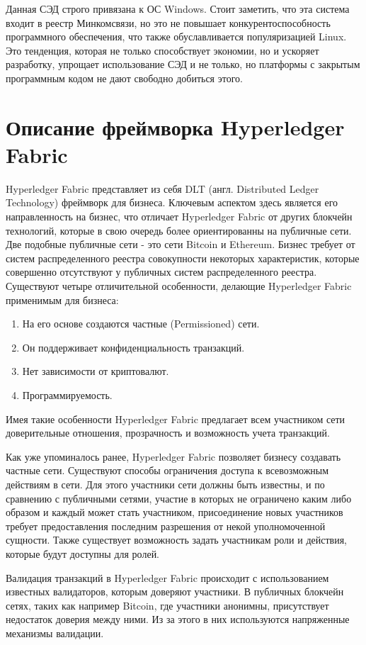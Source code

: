 Данная СЭД строго привязана к ОС Windows. Стоит заметить, что эта система входит в реестр Минкомсвязи, но это не повышает конкурентоспособность программного обеспечения, что также обуславливается популяризацией Linux. Это тенденция, которая не только способствует экономии, но и ускоряет разработку, упрощает использование СЭД и не только, но платформы с закрытым программным кодом не дают свободно добиться этого. 

\section{Описание фреймворка Hyperledger Fabric} \label{sec:ch1/sec3}
Hyperledger Fabric представляет из себя DLT\cite{dlt} (англ. Distributed Ledger Technology) фреймворк для бизнеса. Ключевым аспектом здесь является его направленность на бизнес, что отличает Hyperledger Fabric от других блокчейн технологий, которые в свою очередь более ориентированны  на публичные сети. Две подобные публичные сети - это сети Bitcoin\cite{bitcoin} и Ethereum\cite{ethereumsmarts}. Бизнес  требует от систем распределенного реестра совокупности некоторых характеристик, которые совершенно отсутствуют у публичных систем распределенного реестра. Существуют четыре отличительной особенности, делающие Hyperledger Fabric применимым для бизнеса: 
\begin{enumerate}
	\item На его основе создаются частные (Permissioned) сети.
	\item Он поддерживает конфиденциальность транзакций.
	\item Нет зависимости от криптовалют.
	\item Программируемость.
\end{enumerate}
Имея такие особенности Hyperledger Fabric предлагает всем участником сети доверительные отношения, прозрачность и возможность учета транзакций.

Как уже упоминалось ранее, Hyperledger Fabric позволяет бизнесу создавать частные сети. Существуют способы ограничения доступа к всевозможным действиям в сети. Для этого участники сети должны быть известны, и по сравнению с публичными сетями, участие в которых не ограничено каким либо образом и каждый может стать участником, присоединение новых участников требует предоставления последним разрешения от некой уполномоченной сущности. Также существует возможность задать участникам роли и действия, которые будут доступны для ролей. 

Валидация транзакций в Hyperledger Fabric происходит с использованием известных валидаторов, которым доверяют участники. В публичных блокчейн сетях, таких как например Bitcoin, где участники анонимны, присутствует недостаток доверия между ними. Из за этого в них используются напряженные механизмы валидации. 

